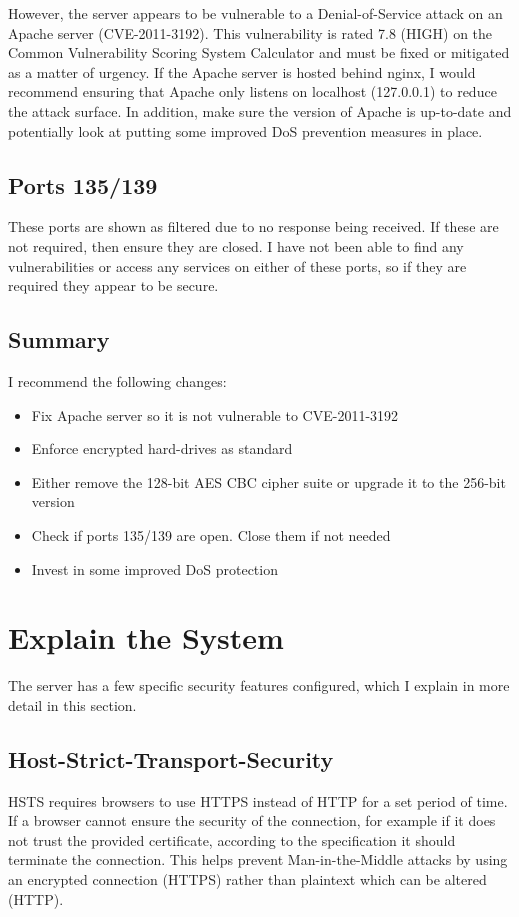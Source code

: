 \documentclass[12pt]{article}
\begin{document}
  However, the server appears to be vulnerable to a Denial-of-Service attack on an Apache server (CVE-2011-3192).
  This vulnerability is rated 7.8 (HIGH) on the Common Vulnerability Scoring System Calculator and must be fixed or mitigated as a matter of urgency.
  If the Apache server is hosted behind nginx, I would recommend ensuring that Apache only listens on localhost (127.0.0.1) to reduce the attack surface.
  In addition, make sure the version of Apache is up-to-date and potentially look at putting some improved DoS prevention measures in place.

  \subsection{Ports 135/139}
  These ports are shown as filtered due to no response being received.
  If these are not required, then ensure they are closed.
  I have not been able to find any vulnerabilities or access any services on either of these ports, so if they are required they appear to be secure.

  \subsection{Summary}
  I recommend the following changes:
  \begin{itemize}
    \item Fix Apache server so it is not vulnerable to CVE-2011-3192
    \item Enforce encrypted hard-drives as standard
    \item Either remove the 128-bit AES CBC cipher suite or upgrade it to the 256-bit version
    \item Check if ports 135/139 are open. Close them if not needed
    \item Invest in some improved DoS protection
  \end{itemize}

  \section{Explain the System}

  The server has a few specific security features configured, which I explain in more detail in this section.

  \subsection{Host-Strict-Transport-Security}
  HSTS requires browsers to use HTTPS instead of HTTP for a set period of time.
  If a browser cannot ensure the security of the connection, for example if it does not trust the provided certificate, according to the specification it should terminate the connection.
  This helps prevent Man-in-the-Middle attacks by using an encrypted connection (HTTPS) rather than plaintext which can be altered (HTTP).
\end{document}
